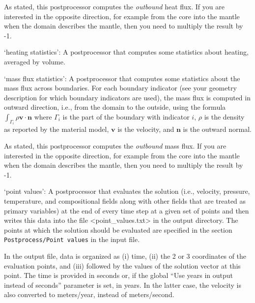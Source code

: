 \begin{itemize}
As stated, this postprocessor computes the \textit{outbound} heat flux. If you are interested in the opposite direction, for example from the core into the mantle when the domain describes the mantle, then you need to multiply the result by -1.

`heating statistics': A postprocessor that computes some statistics about heating, averaged by volume. 

`mass flux statistics': A postprocessor that computes some statistics about the mass flux across boundaries. For each boundary indicator (see your geometry description for which boundary indicators are used), the mass flux is computed in outward direction, i.e., from the domain to the outside, using the formula $\int_{\Gamma_i} \rho \mathbf v \cdot \mathbf n$ where $\Gamma_i$ is the part of the boundary with indicator $i$, $\rho$ is the density as reported by the material model, $\mathbf v$ is the velocity, and $\mathbf n$ is the outward normal. 

As stated, this postprocessor computes the \textit{outbound} mass flux. If you are interested in the opposite direction, for example from the core into the mantle when the domain describes the mantle, then you need to multiply the result by -1.

`point values': A postprocessor that evaluates the solution (i.e., velocity, pressure, temperature, and compositional fields along with other fields that are treated as primary variables) at the end of every time step at a given set of points and then writes this data into the file <point_values.txt> in the output directory. The points at which the solution should be evaluated are specified in the section \texttt{Postprocess/Point values} in the input file.

In the output file, data is organized as (i) time, (ii) the 2 or 3 coordinates of the evaluation points, and (iii) followed by the values of the solution vector at this point. The time is provided in seconds or, if the global ``Use years in output instead of seconds'' parameter is set, in years. In the latter case, the velocity is also converted to meters/year, instead of meters/second.



\end{itemize}
